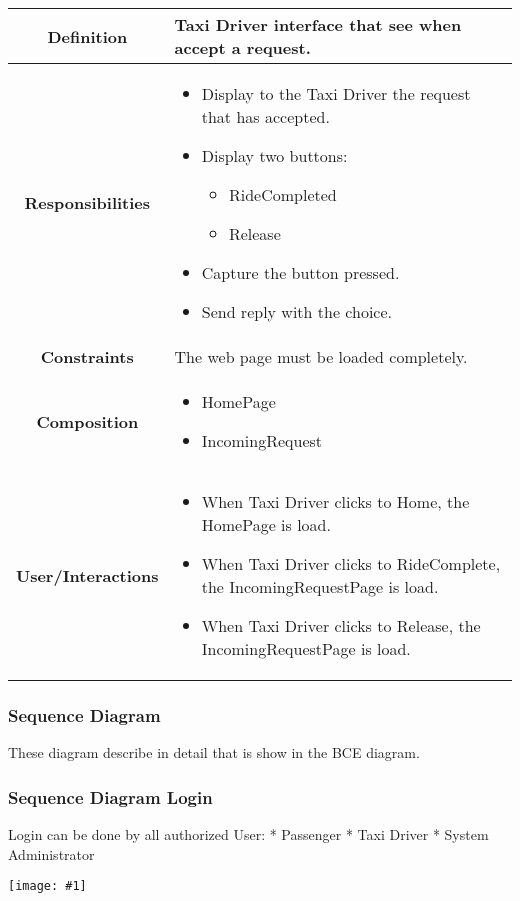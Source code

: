 \documentclass[11pt, a4paper,titlepage]{article}
\newcommand{\image}[1]{
	\begin{center}
		\noindent \texttt{[image: \#1]}
	\end{center}
	}
\begin{document}
\begin{enumerate}
\begin{tabularx}{\textwidth}{| c | X |}
	\hline
	\textbf{Definition} &
	Taxi Driver interface that see when accept a request.\\
	\hline
	\textbf{Responsibilities} &
	\begin{itemize}
		\item Display to the Taxi Driver the request that has accepted.
		\item Display two buttons:
		\begin{itemize}
			\item RideCompleted
			\item Release
		\end{itemize}
		\item Capture the button pressed.
		\item Send reply with the choice.
	\end{itemize}
	\\
	\hline
	\textbf{Constraints} & The web page must be loaded completely.
	\\
	\hline
	\textbf{Composition} &
	\begin{itemize}
		\item HomePage
		\item IncomingRequest
	\end{itemize}
	\\
	\hline
	\textbf{User/Interactions} &
	\begin{itemize}
		\item When Taxi Driver clicks to Home, the HomePage is load.	
		\item When Taxi Driver clicks to RideComplete, the IncomingRequestPage is load.
		\item When Taxi Driver clicks to Release, the IncomingRequestPage is load.
	\end{itemize}
	\\
	\hline 
\end{tabularx}


\end{enumerate}
	

	
	

\subsubsection{Sequence Diagram }
These diagram describe in detail that is show in the BCE diagram.
\subsubsection{Sequence Diagram Login}
  Login can be done by all authorized User:
	  * Passenger
	  * Taxi Driver
	  * System Administrator
\image{sequenceDiagramsLogin.png}
\newpage
\end{document}

